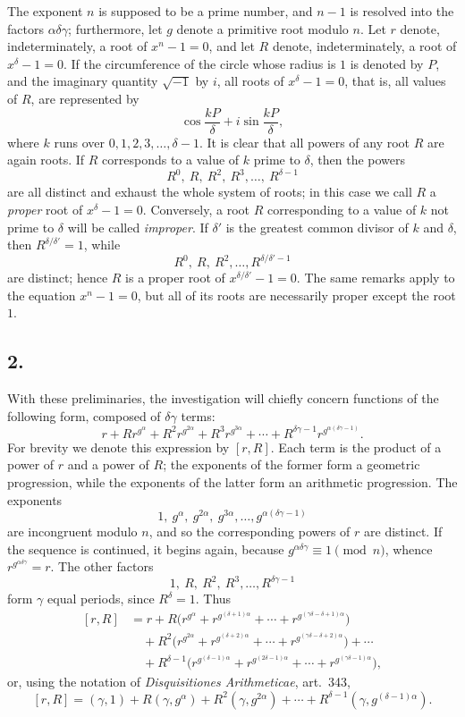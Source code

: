 \documentclass[12pt]{article}
\begin{document}
The exponent $n$ is supposed to be a prime number, and $n-1$ is resolved into the factors $\alpha\delta\gamma$; furthermore, let $g$ denote a primitive root modulo $n$. Let $r$ denote, indeterminately, a root of $x^n-1=0$, and let $R$ denote, indeterminately, a root of $x^\delta-1=0$. If the circumference of the circle whose radius is $1$ is denoted by $P$, and the imaginary quantity $\sqrt{-1}$ by $i$, all roots of $x^\delta-1=0$, that is, all values of $R$, are represented by
\[
\cos \frac{kP}{\delta}+i\sin\frac{kP}{\delta},
\]
where $k$ runs over $0,1,2,3,\ldots,\delta-1$. It is clear that all powers of any root $R$ are again roots. If $R$ corresponds to a value of $k$ prime to $\delta$, then the powers
\[
R^0,\ R,\ R^2,\ R^3,\ldots,\ R^{\delta-1}
\]
are all distinct and exhaust the whole system of roots; in this case we call $R$ a \emph{proper} root of $x^\delta-1=0$. Conversely, a root $R$ corresponding to a value of $k$ not prime to $\delta$ will be called \emph{improper}. If $\delta'$ is the greatest common divisor of $k$ and $\delta$, then $R^{\delta/\delta'}=1$, while
\[
R^0,\ R,\ R^2,\ldots,R^{\delta/\delta'-1}
\]
are distinct; hence $R$ is a proper root of $x^{\delta/\delta'}-1=0$. The same remarks apply to the equation $x^n-1=0$, but all of its roots are necessarily proper except the root $1$.

\subsection*{2.}

With these preliminaries, the investigation will chiefly concern functions of the following form, composed of $\delta\gamma$ terms:
\[
r+Rr^{g^\alpha}+R^2r^{g^{2\alpha}}+R^3r^{g^{3\alpha}}+\cdots+
R^{\delta\gamma-1}r^{g^{\alpha(\delta\gamma-1)}}.
\]
For brevity we denote this expression by $[r,R]$. Each term is the product of a power of $r$ and a power of $R$; the exponents of the former form a geometric progression, while the exponents of the latter form an arithmetic progression. The exponents
\[
1,\ g^\alpha,\ g^{2\alpha},\ g^{3\alpha},\ldots,g^{\alpha(\delta\gamma-1)}
\]
are incongruent modulo $n$, and so the corresponding powers of $r$ are distinct. If the sequence is continued, it begins again, because $g^{\alpha\delta\gamma}\equiv1\pmod n$, whence $r^{g^{\alpha\delta\gamma}}=r$. The other factors
\[
1,\ R,\ R^2,\ R^3,\ldots,R^{\delta\gamma-1}
\]
form $\gamma$ equal periods, since $R^\delta=1$. Thus
\[
\begin{aligned}
{}[r,R]&=
r+R\bigl(r^{g^\alpha}+r^{g^{(\delta+1)\alpha}}+\cdots+r^{g^{(\gamma\delta-\delta+1)\alpha}}\bigr)\\
&\quad+R^2\bigl(r^{g^{2\alpha}}+r^{g^{(\delta+2)\alpha}}+\cdots+r^{g^{(\gamma\delta-\delta+2)\alpha}}\bigr)+\cdots\\
&\quad+R^{\delta-1}\bigl(r^{g^{(\delta-1)\alpha}}+r^{g^{(2\delta-1)\alpha}}+\cdots+r^{g^{(\gamma\delta-1)\alpha}}\bigr),
\end{aligned}
\]
or, using the notation of \emph{Disquisitiones Arithmeticae}, art.~343,
\[
[r,R]=(\gamma,1)+R(\gamma,g^\alpha)+R^2(\gamma,g^{2\alpha})+\cdots+R^{\delta-1}(\gamma,g^{(\delta-1)\alpha}).
\]
\end{document}
